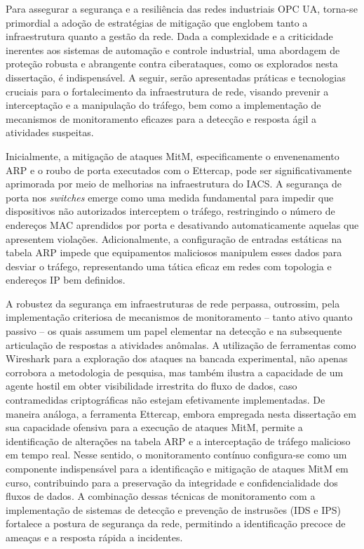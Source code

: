        Para assegurar a segurança e a resiliência das redes industriais OPC UA, torna-se primordial a adoção de estratégias de mitigação que englobem tanto a infraestrutura quanto a gestão da rede. Dada a complexidade e a criticidade inerentes aos sistemas de automação e controle industrial, uma abordagem de proteção robusta e abrangente contra ciberataques, como os explorados nesta dissertação, é indispensável. A seguir, serão apresentadas práticas e tecnologias cruciais para o fortalecimento da infraestrutura de rede, visando prevenir a interceptação e a manipulação do tráfego, bem como a implementação de mecanismos de monitoramento eficazes para a detecção e resposta ágil a atividades suspeitas.
        
        Inicialmente, a mitigação de ataques MitM, especificamente o envenenamento ARP e o roubo de porta executados com o Ettercap, pode ser significativamente aprimorada por meio de melhorias na infraestrutura do IACS. A segurança de porta nos \textit{switches} emerge como uma medida fundamental para impedir que dispositivos não autorizados interceptem o tráfego, restringindo o número de endereços MAC aprendidos por porta e desativando automaticamente aquelas que apresentem violações. Adicionalmente, a configuração de entradas estáticas na tabela ARP impede que equipamentos maliciosos manipulem esses dados para desviar o tráfego, representando uma tática eficaz em redes com topologia e endereços IP bem definidos.
        
        A robustez da segurança em infraestruturas de rede perpassa, outrossim, pela implementação criteriosa de mecanismos de monitoramento -- tanto ativo quanto passivo -- os quais assumem um papel elementar na detecção e na subsequente articulação de respostas a atividades anômalas. A utilização de ferramentas como Wireshark para a exploração dos ataques na bancada experimental, não apenas corrobora a metodologia de pesquisa, mas também ilustra a capacidade de um agente hostil em obter visibilidade irrestrita do fluxo de dados, caso contramedidas criptográficas não estejam efetivamente implementadas. De maneira análoga, a ferramenta Ettercap, embora empregada nesta dissertação em sua capacidade ofensiva para a execução de ataques MitM, permite a identificação de alterações na tabela ARP e a interceptação de tráfego malicioso em tempo real. Nesse sentido, o monitoramento contínuo configura-se como um componente indispensável para a identificação e mitigação de ataques MitM em curso, contribuindo para a preservação da integridade e confidencialidade dos fluxos de dados. A combinação dessas técnicas de monitoramento com a implementação de sistemas de detecção e prevenção de instrusões (IDS e IPS) fortalece a postura de segurança da rede, permitindo a identificação precoce de ameaças e a resposta rápida a incidentes.
        
